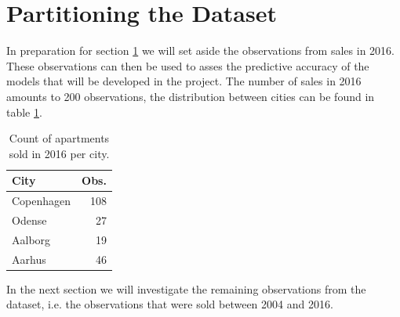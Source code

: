 \section{Partitioning the Dataset}
In preparation for section \ref{} we will set aside the observations from sales in 2016.
These observations can then be used to asses the predictive accuracy of the models that will be developed in the project.
The number of sales in 2016 amounts to 200 observations, the distribution between cities can be found in table \ref{tbl:2016_obs_per_city}.
\begin{table}[H]
    \centering
    \begin{tabular}{lr}
        \toprule
        \textbf{City} & \textbf{Obs.}\\
        \midrule
        Copenhagen & 108\\
        Odense & 27\\
        Aalborg & 19\\
        Aarhus & 46\\
        \bottomrule
    \end{tabular}
    \caption{Count of apartments sold in 2016 per city.}
    \label{tbl:2016_obs_per_city}
\end{table}
In the next section we will investigate the remaining observations from the dataset, i.e. the observations that were sold between 2004 and 2016.

